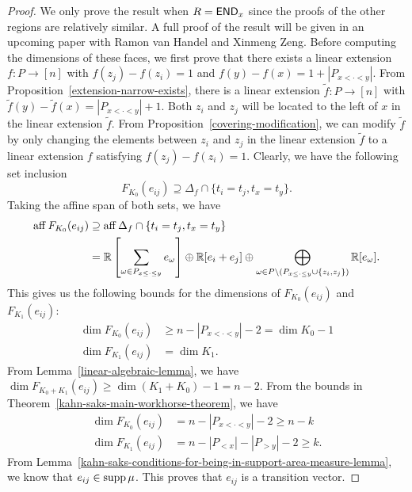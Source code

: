 \documentclass{puthesis-UG}
\begin{document}
\begin{proof}
	 We only prove the result when $R = \mathsf{END}_x$ since the proofs of the other regions are relatively similar. A full proof of the result will be given in an upcoming paper with Ramon van Handel and Xinmeng Zeng. Before computing the dimensions of these faces, we first prove that there exists a linear extension $f : P \to [n]$ with $f(z_j) - f(z_i) = 1$ and $f(y) - f(x) = 1 + |P_{x < \cdot < y}|$. From Proposition~\ref{extension-narrow-exists}, there is a linear extension $\tilde{f} : P \to [n]$ with $\tilde{f}(y) - \tilde{f}(x) = |P_{x < \cdot < y}| + 1$. Both $z_i$ and $z_j$ will be located to the left of $x$ in the linear extension $\tilde{f}$. From Proposition~\ref{covering-modification}, we can modify $\tilde{f}$ by only changing the elements between $z_i$ and $z_j$ in the linear extension $\tilde{f}$ to a linear extension $f$ satisfying $f(z_j) - f(z_i) = 1$. Clearly, we have the following set inclusion
    \[
        F_{K_0}(e_{ij}) \supseteq \Delta_f \cap \{t_i = t_j, t_x = t_y\}.
    \]
    Taking the affine span of both sets, we have 
    \begin{align*}
        \operatorname{aff} F_{K_0}(e_{ij}) & \supseteq \operatorname{aff} \Delta_f \cap \{t_i = t_j, t_x = t_y\} \\
        & = \mathbb{R} \left [ \sum_{\omega \in P_{x \leq \cdot \leq y}} e_\omega \right ] \oplus \mathbb{R} [ e_i + e_j] \oplus \bigoplus_{\omega \in P \backslash (P_{x \leq \cdot \leq y} \cup \{z_i, z_j\})} \mathbb{R}[e_\omega]. 
    \end{align*}
    This gives us the following bounds for the dimensions of $F_{K_0}(e_{ij})$ and $F_{K_1}(e_{ij})$:
    \begin{align*}
        \dim F_{K_0}(e_{ij}) & \geq n - |P_{x < \cdot < y}| - 2 = \dim K_0 - 1\\
        \dim F_{K_1}(e_{ij}) & = \dim K_1. 
    \end{align*}
    From Lemma~\ref{linear-algebraic-lemma}, we have $\dim F_{K_0 + K_1}(e_{ij}) \geq \dim (K_1 + K_0) - 1 = n-2$. From the bounds in Theorem~\ref{kahn-saks-main-workhorse-theorem}, we have 
    \begin{align*}
        \dim F_{K_0}(e_{ij}) & = n - |P_{x < \cdot < y}| - 2 \geq n - k \\
        \dim F_{K_1}(e_{ij}) & = n - |P_{< x}| - |P_{> y}| - 2 \geq k. 
    \end{align*}
    From Lemma~\ref{kahn-saks-conditions-for-being-in-support-area-measure-lemma}, we know that $e_{ij} \in \operatorname{supp} \mu$. This proves that $e_{ij}$ is a transition vector.
\end{proof}
\end{document}
